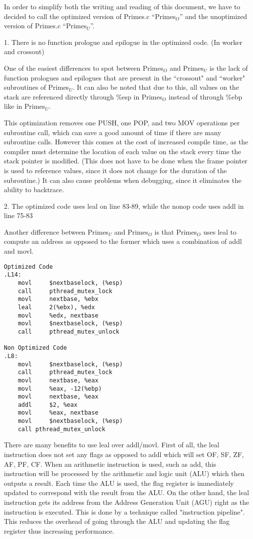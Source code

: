 \documentclass[11pt]{article}
\begin{document}
In order to simplify both the writing and reading of this document, we have to decided to call the optimized version of Primes.c ``Primes$_{O}$'' and the unoptimized version of Primes.c ``Primes$_{U}$''.

1. There is no function prologue and epilogue in the optimized code. (In worker and crossout)

One of the easiest differences to spot between Primes$_{O}$ and Primes$_{U}$ is the lack of function prologues and epilogues that are present in the ``crossout" and ``worker" subroutines of Primes$_{U}$. It can also be noted that due to this, all values on the stack are referenced directly through \%esp in Primes$_{O}$ instead of through \%ebp like in Primes$_{U}$.

This optimization removes one PUSH, one POP, and two MOV operations per subroutine call, which can save a good amount of time if there are many subroutine calls. However this comes at the cost of increased compile time, as the compiler must determine the location of each value on the stack every time the stack pointer is modified. (This does not have to be done when the frame pointer is used to reference values, since it does not change for the duration of the subroutine.) It can also cause problems when debugging, since it eliminates the ability to backtrace. 

2. The optimized code uses leal on line 83-89, while the nonop code uses addl in line 75-83


Another difference between Primes$_{U}$ and Primes$_{O}$ is that Primes$_{O}$ uses leal to compute an address as opposed to the former which uses a combination of addl and movl. 

\begin{verbatim}
Optimized Code
.L14:
    movl	 $nextbaselock, (%esp)
    call	 pthread_mutex_lock
    movl	 nextbase, %ebx
    leal	 2(%ebx), %edx
    movl	 %edx, nextbase
    movl	 $nextbaselock, (%esp)
    call	 pthread_mutex_unlock
	
Non Optimized Code
.L8:
    movl	 $nextbaselock, (%esp)
    call	 pthread_mutex_lock
    movl	 nextbase, %eax         
    movl	 %eax, -12(%ebp)        
    movl	 nextbase, %eax         
    addl	 $2, %eax
    movl	 %eax, nextbase
    movl	 $nextbaselock, (%esp)
    call pthread_mutex_unlock
\end{verbatim}

There are many benefits to use leal over addl/movl. First of all, the leal instruction does not set any flags as opposed to addl which will set OF, SF, ZF, AF, PF, CF. When an arithmetic instruction is used, such as add, this instruction will be processed by the arithmetic and logic unit (ALU) which then outputs a result. Each time the ALU is used, the flag register is immediately updated to correspond with the result from the ALU. On the other hand, the leal instruction gets its address from the Address Generation Unit (AGU) right as the instruction is executed. This is done by a technique called "instruction pipeline". This reduces the overhead of going through the ALU and updating the flag register thus increasing performance.
\end{document}
